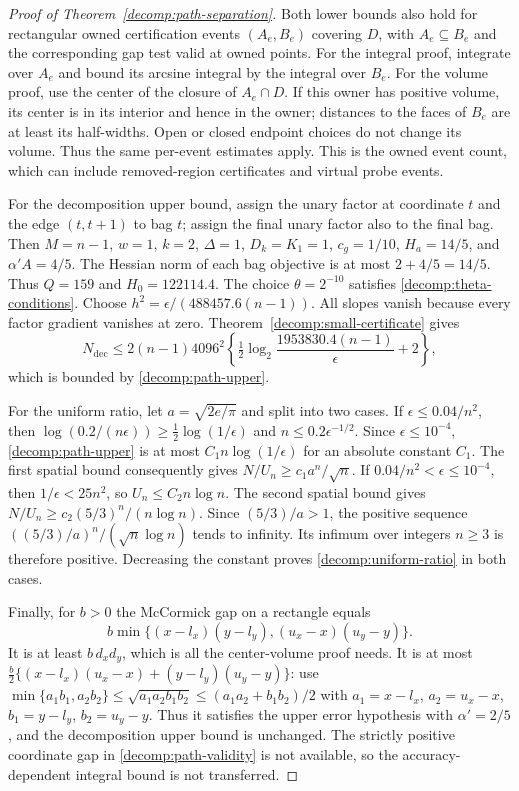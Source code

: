 \begin{proof}[Proof of Theorem~\ref{decomp:path-separation}]
Both lower bounds also hold for rectangular owned certification events
$(A_e,B_e)$ covering $D$, with $A_e\subseteq B_e$ and the corresponding
gap test valid at owned points. For the integral proof, integrate over
$A_e$ and bound its arcsine integral by the integral over $B_e$.
For the volume proof, use the center of the closure of $A_e\cap D$.
If this owner has positive volume, its center is in its interior and
hence in the owner; distances to the faces of $B_e$ are at least its
half-widths. Open or closed endpoint choices do not change its volume.
Thus the same per-event estimates apply. This is the owned event count,
which can include removed-region certificates and virtual probe events.

For the decomposition upper bound, assign the unary factor at coordinate
$t$ and the edge $(t,t+1)$ to bag $t$; assign the final unary factor also
to the final bag. Then $M=n-1$, $w=1$, $k=2$, $\Delta=1$,
$D_k=K_1=1$, $c_g=1/10$, $H_a=14/5$, and $\alpha'A=4/5$.
The Hessian norm of each bag objective is at most $2+4/5=14/5$.
Thus $Q=159$ and $H_0=122114.4$. The choice $\theta=2^{-10}$ satisfies
\eqref{decomp:theta-conditions}. Choose
$h^2=\epsilon/(488457.6(n-1))$.
All slopes vanish because every factor gradient vanishes at zero.
Theorem~\ref{decomp:small-certificate} gives
\[
 N_{\mathrm{dec}}\le2(n-1)4096^2
 \left\{\tfrac12\log_2\frac{1953830.4(n-1)}{\epsilon}+2\right\},
\]
which is bounded by \eqref{decomp:path-upper}.

For the uniform ratio, let $a=\sqrt{2e/\pi}$ and split into two cases.
If $\epsilon\le0.04/n^2$, then
$\log(0.2/(n\epsilon))\ge\tfrac12\log(1/\epsilon)$ and
$n\le0.2\epsilon^{-1/2}$. Since $\epsilon\le10^{-4}$,
\eqref{decomp:path-upper} is at most $C_1n\log(1/\epsilon)$ for an
absolute constant $C_1$. The first spatial bound consequently gives
$N/U_n\ge c_1a^n/\sqrt n$.
If $0.04/n^2<\epsilon\le10^{-4}$, then $1/\epsilon<25n^2$,
so $U_n\le C_2n\log n$. The second spatial bound gives
$N/U_n\ge c_2(5/3)^n/(n\log n)$.
Since $(5/3)/a>1$, the positive sequence
$((5/3)/a)^n/(\sqrt n\log n)$ tends to infinity. Its infimum over
integers $n\ge3$ is therefore positive. Decreasing the constant proves
\eqref{decomp:uniform-ratio} in both cases.

Finally, for $b>0$ the McCormick gap on a rectangle equals
\[
 b\min\{(x-l_x)(y-l_y),(u_x-x)(u_y-y)\}.
\]
It is at least $b\,d_xd_y$, which is all the center-volume proof needs.
It is at most
$\tfrac b2\{(x-l_x)(u_x-x)+(y-l_y)(u_y-y)\}$:
use $\min\{a_1b_1,a_2b_2\}\le\sqrt{a_1a_2b_1b_2}
\le(a_1a_2+b_1b_2)/2$ with
$a_1=x-l_x$, $a_2=u_x-x$, $b_1=y-l_y$, $b_2=u_y-y$.
Thus it satisfies the upper error hypothesis with $\alpha'=2/5$,
and the decomposition upper bound is unchanged. The strictly positive
coordinate gap in \eqref{decomp:path-validity} is not available, so the
accuracy-dependent integral bound is not transferred.
\end{proof}
